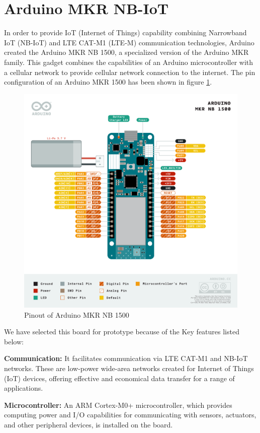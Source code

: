 \section{Arduino MKR NB-IoT} 
In order to provide IoT (Internet of Things) capability combining Narrowband IoT (NB-IoT) and LTE CAT-M1 (LTE-M) communication technologies, Arduino created the Arduino MKR NB 1500, a specialized version of the Arduino MKR family. This gadget combines the capabilities of an Arduino microcontroller with a cellular network to provide cellular network connection to the internet. The pin configuration of an Arduino MKR 1500 has been shown in figure \ref{fig:x Arduino Pinout}. \par
\begin{figure}[htbp]
\centering
\includegraphics[scale=0.4]{images/Arduino MKR.png}
\caption{Pinout of Arduino MKR NB 1500}
\label{fig:x Arduino Pinout}
\end{figure}
We have selected this board for prototype because of the Key features listed below:\par
\textbf{Communication:} It facilitates communication via LTE CAT-M1 and NB-IoT networks. These are low-power wide-area networks created for Internet of Things (IoT) devices, offering effective and economical data transfer for a range of applications.

\par 
\textbf{Microcontroller:} An ARM Cortex-M0+ microcontroller, which provides computing power and I/O capabilities for communicating with sensors, actuators, and other peripheral devices, is installed on the board.

